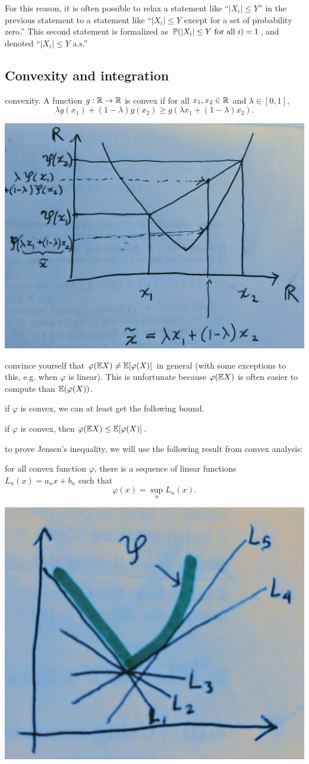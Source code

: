 \documentclass{article}
\begin{document}
For this reason, it is often possible to relax a statement like ``$|X_i| \le Y$'' in the previous statement to a statement like ``$|X_i| \le Y$ except for a set of probability zero.'' This second statement is formalized as $\P(|X_i| \le Y \text{ for all }i) = 1$, and denoted ``$|X_i| \le Y$ a.s.''


\subsection{Convexity and integration}\label{sec:convexity}

 convexity. A function $g : \R \to \R$ is convex if for all $x_1, x_2 \in \R$ and $\lambda \in [0, 1]$, 
\[ \lambda g(x_1) + (1 - \lambda) g(x_2) \ge g(\lambda x_1 + (1 - \lambda) x_2). \]
\begin{center}
	\includegraphics[width=0.6\linewidth]{figures/convex}
\end{center}

 convince yourself that $\varphi(\E X) \neq \E[\varphi(X)]$ in general (with some exceptions to this, e.g. when $\varphi$ is linear). This is unfortunate because $\varphi(\E X)$ is often easier to compute than $\E(\varphi(X))$.

 if $\varphi$ is convex, we can at least get the following bound.

 if $\varphi$ is convex, then $\varphi(\E X) \le \E[\varphi(X)]$.

 to prove Jensen's inequality, we will use the following result from convex analysis:

 for all convex function $\varphi$, there is a sequence of linear functions $L_n(x) = a_n x + b_n$ such that 
\[ \varphi(x) = \sup_n L_n(x). \]
\begin{center}
	\includegraphics[width=0.3\linewidth]{figures/convex-support}
\end{center}
\end{document}
